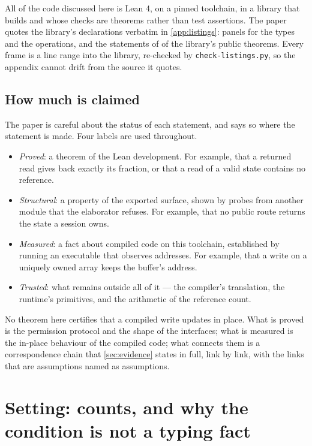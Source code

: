 \documentclass[11pt,a4paper]{article}
\theoremstyle{definition}
\theoremstyle{plain}
\newcommand{\code}[1]{\texttt{#1}}
\begin{document}
All of the code discussed here is Lean 4, on a pinned toolchain, in a library
that builds and whose checks are theorems rather than test assertions. The
paper quotes the library's declarations verbatim in \cref{app:listings}:
\panelcount{} panels for the types and the operations, and the statements of
\lawcount{} of the library's \theoremcount{} public theorems. Every frame is a
line range into the library, re-checked by \code{check-listings.py}, so the
appendix cannot drift from the source it quotes.

\subsection{How much is claimed}

The paper is careful about the status of each statement, and says so where the
statement is made. Four labels are used throughout.

\begin{itemize}[leftmargin=1.4em,itemsep=2pt]
\item \emph{Proved}: a theorem of the Lean development. For example, that a
returned read gives back exactly its fraction, or that a read of a valid state
contains no reference.
\item \emph{Structural}: a property of the exported surface, shown by probes
from another module that the elaborator refuses. For example, that no public
route returns the state a session owns.
\item \emph{Measured}: a fact about compiled code on this toolchain, established
by running an executable that observes addresses. For example, that a write on a
uniquely owned array keeps the buffer's address.
\item \emph{Trusted}: what remains outside all of it --- the compiler's
translation, the runtime's primitives, and the arithmetic of the reference
count.
\end{itemize}

No theorem here certifies that a compiled write updates in place. What is proved
is the permission protocol and the shape of the interfaces; what is measured is
the in-place behaviour of the compiled code; what connects them is a
correspondence chain that \cref{sec:evidence} states in full, link by link, with
the links that are assumptions named as assumptions.

\section{Setting: counts, and why the condition is not a typing fact}\label{sec:setting}
\end{document}
